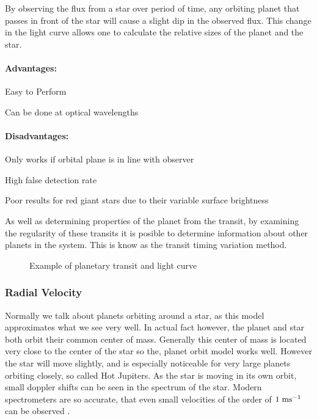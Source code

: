 By observing the flux from a star over period of time, any orbiting planet that passes in front of the star will cause a slight dip in the observed flux. This change in the light curve allows one to calculate the relative sizes of the planet and the star.


\paragraph{Advantages:}
\begin{itemize*}
    \item Easy to Perform
    \item Can be done at optical wavelengths
\end{itemize*}

\paragraph{Disadvantages:}
\begin{itemize*}
    \item Only works if orbital plane is in line with observer
    \item High false detection rate \citep{santerne2012sophie}
    \item Poor results for red giant stars due to their variable surface brightness
\end{itemize*}

As well as determining properties of the planet from the transit, by examining the regularity of these transits it is posible to determine information about other planets in the system. This is know as the transit timing variation method.

\begin{figure}
    \centering
    \def\svgwidth{\columnwidth}
    
    \caption{Example of planetary transit and light curve}
    \label{fig:transit}
\end{figure}

\subsubsection{Radial Velocity}

Normally we talk about planets orbiting around a star, as this model approximates what we see very well. In actual fact however, the planet and star both orbit their common center of mass. Generally this center of mass is located very close to the center of the star so the, planet orbit model works well. However the star will move slightly, and is especially noticeable for very large planets orbiting closely, so called Hot Jupiters. As the star is moving in its own orbit, small doppler shifts can be seen in the spectrum of the star. Modern spectrometers are so accurate, that even small velocities of the order of $1\;\mathrm{ms^{-1}}$ can be observed \citep{ge2002externally}.

